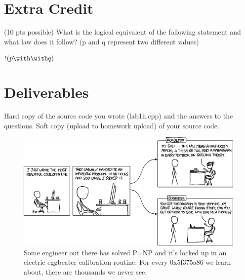 \documentclass[letterpaper,12pt]{article}
\begin{document}
\section*{Extra Credit}
(10 pts possible) What is the logical equivalent of the following statement and what law does it follow?
    (p and q represent two different values)

    $!( p \with \with q )$
\section*{Deliverables}
Hard copy of the source code you wrote (lab1h.cpp) and the answers to the questions.
Soft copy (upload to homework upload) of your source code.

\begin{figure}[ht!]
	\centering
	\includegraphics[width=5in]{academia_vs_business.png}
    \caption*{Some engineer out there has solved P=NP and it's locked up in an electric eggbeater calibration routine.  For every 0x5f375a86 we learn about, there are thousands we never see.}
\end{figure}
\end{document}
